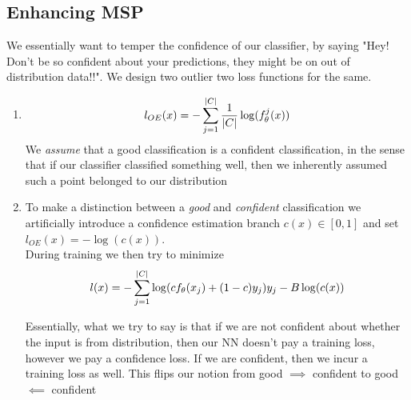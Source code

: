 \documentclass[11pt]{report}
\begin{document}
\subsection{Enhancing MSP}
We essentially want to temper the confidence of our classifier, by saying "Hey! Don't be so confident about your predictions, they might be on out of distribution data!!". We design two outlier two loss functions for the same.
\vspace{1mm}
\begin{enumerate}
    \item \label{mpp:gen_0}
    \begin{align}
        l_{OE}(x)= - \sum_{j=1}^{|C|} \frac{1}{|C|} \log(f_\theta^j(x)) \nonumber
    \end{align}
    We \emph{assume} that a good classification is a confident classification, in the sense that if our classifier classified something well, then we inherently assumed such a point belonged to our distribution

    \item \label{mpp:gen_1} To make a distinction between a \emph{good} and \emph{confident} classification we artificially introduce a confidence estimation branch \(c(x) \in [0,1]\) and set \(l_{OE}(x)=-\log(c(x))\).\\
    \vspace{1mm}
    During training we then try to minimize
    \begin{align}
        l(x)= - \sum_{j=1}^{|C|} \log(cf_\theta(x_j)+(1-c)y_j)y_j -B\log(c(x)) \nonumber
    \end{align}

    Essentially, what we try to say is that if we are not confident about whether the input is from distribution, then our NN doesn't pay a training loss, however we pay a confidence loss. If we are confident, then we incur a training loss as well. This flips our notion from good \(\implies\) confident to good \(\impliedby\) confident
    
\end{enumerate}
\end{document}
